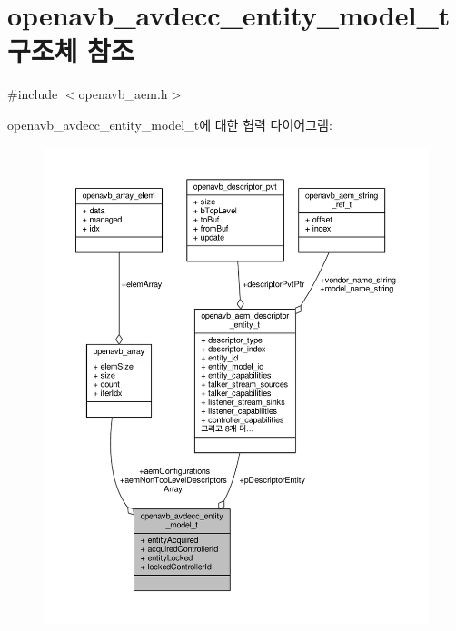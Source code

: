 \hypertarget{structopenavb__avdecc__entity__model__t}{}\section{openavb\+\_\+avdecc\+\_\+entity\+\_\+model\+\_\+t 구조체 참조}
\label{structopenavb__avdecc__entity__model__t}


{\ttfamily \#include $<$openavb\+\_\+aem.\+h$>$}



openavb\+\_\+avdecc\+\_\+entity\+\_\+model\+\_\+t에 대한 협력 다이어그램\+:
\nopagebreak
\begin{figure}[H]
\begin{center}
\leavevmode
\includegraphics[width=350pt]{structopenavb__avdecc__entity__model__t__coll__graph}
\end{center}
\end{figure}
